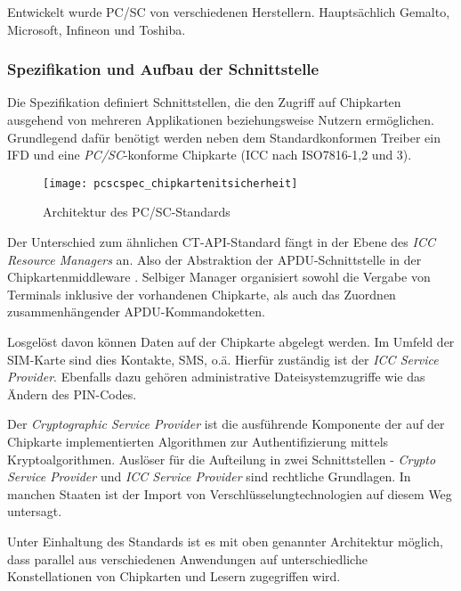 Entwickelt wurde PC/SC von verschiedenen Herstellern. Hauptsächlich
Gemalto, Microsoft, Infineon und Toshiba.

\subsubsection{Spezifikation und Aufbau der Schnittstelle}
Die Spezifikation definiert Schnittstellen, die den Zugriff auf Chipkarten ausgehend
von mehreren Applikationen beziehungsweise Nutzern ermöglichen. Grundlegend
dafür benötigt werden neben dem Standardkonformen Treiber ein \ac{IFD} und
eine \textit{PC/SC}-konforme Chipkarte (\ac{ICC} nach ISO7816-1,2 und 3).

 \begin{figure}[htp]
  \begin{center}
   \texttt{[image: pcscspec\_chipkartenitsicherheit]}
  \end{center}
  \caption[Architektur des PC/SC-Standards]{Architektur des PC/SC-Standards \cite{spitz11}}
  \label{abb:architektur_pcsc}
 \end{figure}

Der Unterschied zum ähnlichen CT-API-Standard fängt in der Ebene
des \textit{ICC Resource Managers} an. Also der Abstraktion der
APDU-Schnittstelle in der Chipkartenmiddleware \cite{spitz11}.
Selbiger Manager organisiert sowohl die Vergabe von Terminals inklusive
der vorhandenen Chipkarte, als auch das Zuordnen zusammenhängender
APDU-Kommandoketten.

Losgelöst davon können Daten auf der Chipkarte abgelegt werden. Im Umfeld
der SIM-Karte sind dies Kontakte, SMS, o.ä. Hierfür zuständig ist der
\textit{ICC Service Provider}. Ebenfalls dazu gehören administrative Dateisystemzugriffe
wie das Ändern des PIN-Codes.

Der \textit{Cryptographic Service Provider} ist die ausführende Komponente
der auf der Chipkarte implementierten Algorithmen zur Authentifizierung mittels
Kryptoalgorithmen. Auslöser für die Aufteilung in zwei Schnittstellen -
\textit{Crypto Service Provider} und \textit{ICC Service Provider} sind
rechtliche Grundlagen. In manchen Staaten ist der Import von
Verschlüsselungtechnologien auf diesem Weg untersagt.

Unter Einhaltung des Standards ist es mit oben genannter Architektur möglich,
dass parallel aus verschiedenen Anwendungen auf unterschiedliche Konstellationen
von Chipkarten und Lesern zugegriffen wird.

